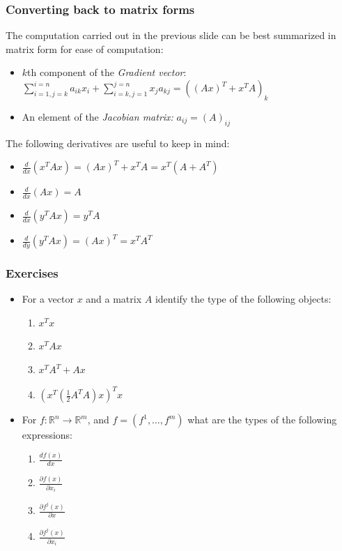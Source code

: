 \documentclass{beamer}
\begin{document}
\begin{frame}
\frametitle{Converting back to matrix forms}
The computation carried out in the previous slide can be best summarized in matrix form for ease of computation:
\begin{itemize}
    \item $k$th component of the \textit{Gradient vector}: $ \sum_{i=1, j=k}^{i=n}a_{ik}x_i + \sum_{i=k, j=1}^{j=n}x_ja_{kj} = ((Ax)^T + x^TA)_k$
    \item An element of the \textit{Jacobian matrix:} $a_{ij} = (A)_{ij} $
\end{itemize}

The following derivatives are useful to keep in mind:
\begin{itemize}
    \item $\frac{d}{dx}(x^TAx)=(Ax)^T+x^TA = x^T(A+A^T)$
    \item $\frac{d}{dx}(Ax)=A$
    \item $\frac{d}{dx}(y^TAx)=y^TA$
    \item $\frac{d}{dy}(y^TAx)=(Ax)^T=x^TA^T$
\end{itemize}

\end{frame}


\begin{frame}
\frametitle{Exercises}
\begin{itemize}
    \item For a vector $x$ and a matrix $A$ identify the type of the following objects:
    \begin{enumerate}
        \item $x^Tx$
        \item $x^TAx$
        \item $x^TA^T + Ax$
        \item $(x^T(\frac{1}{2}A^TA)x)^Tx$
    \end{enumerate}
    \item For $f: \mathbb{R}^n \rightarrow \mathbb{R}^m$, and $f=(f^1,\dots,f^m)$ what are the types of the following expressions:
    \begin{enumerate}
        \item $\frac{df(x)}{dx}$
        \item $\frac{\partial f(x)}{\partial x_i}$
        \item $\frac{\partial f^j(x)}{\partial x}$
        \item $\frac{\partial f^j(x)}{\partial x_i}$
    \end{enumerate}
\end{itemize}

\end{frame}
\end{document}
